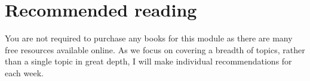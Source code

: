 
\section{Recommended reading}

You are not required to purchase any books for this module as there are many free resources available online. As we focus on covering a breadth of topics, rather than a single topic in great depth, I will make individual recommendations for each week.
